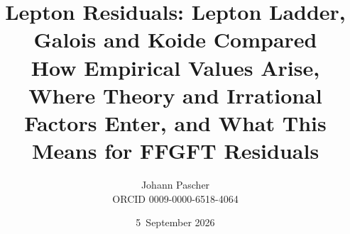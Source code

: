 \documentclass[11pt,a4paper]{report}
\title{Lepton Residuals: Lepton Ladder, Galois and Koide Compared\\[0.5em]
  \large How Empirical Values Arise, Where Theory and Irrational Factors Enter,
  and What This Means for FFGFT Residuals}
\date{5~September 2026}
\author{Johann Pascher\\\small ORCID 0009-0000-6518-4064}
\begin{document}
\renewcommand{\thechapter}{}
\renewcommand{\thesection}{\arabic{section}}
\maketitle
\tableofcontents

\end{document}
